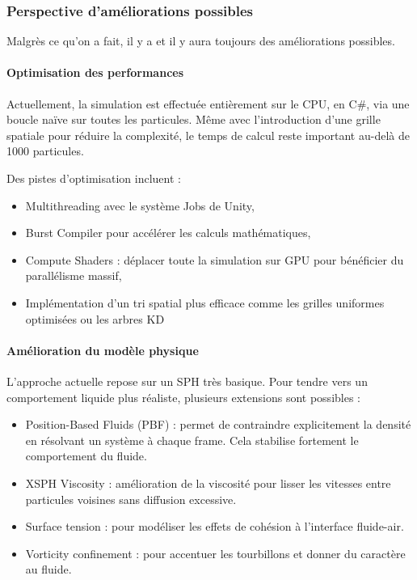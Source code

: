 \documentclass{article}
\begin{document}
\subsubsection{Perspective d'améliorations possibles}

Malgrès ce qu'on a fait, il y a et il y aura toujours des améliorations possibles.

\paragraph{Optimisation des performances}


Actuellement, la simulation est effectuée entièrement sur le CPU, en C\#, via une boucle naïve sur toutes les particules. Même avec l’introduction d’une grille spatiale pour réduire la complexité, le temps de calcul reste important au-delà de 1000 particules.

Des pistes d’optimisation incluent :

\begin{itemize}

\item Multithreading avec le système Jobs de Unity,
\item Burst Compiler pour accélérer les calculs mathématiques,
\item Compute Shaders : déplacer toute la simulation sur GPU pour bénéficier du parallélisme massif,
\item Implémentation d’un tri spatial plus efficace comme les grilles uniformes optimisées ou les arbres KD
\end{itemize}

\paragraph{Amélioration du modèle physique}

L’approche actuelle repose sur un SPH très basique. Pour tendre vers un comportement liquide plus réaliste, plusieurs extensions sont possibles :
\begin{itemize}
\item Position-Based Fluids (PBF) : permet de contraindre explicitement la densité en résolvant un système à chaque frame. Cela stabilise fortement le comportement du fluide.
\item XSPH Viscosity : amélioration de la viscosité pour lisser les vitesses entre particules voisines sans diffusion excessive.
\item Surface tension : pour modéliser les effets de cohésion à l’interface fluide-air.
\item Vorticity confinement : pour accentuer les tourbillons et donner du caractère au fluide.
\end{itemize}
\end{document}
